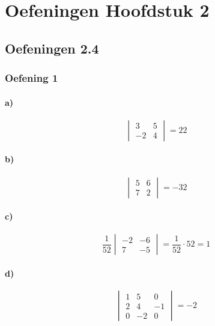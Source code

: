 \documentclass[lineaire_algebra_oplossingen.tex]{subfiles}
\begin{document}
\chapter{Oefeningen Hoofdstuk 2}
\section{Oefeningen 2.4}
\subsection{Oefening 1}
\subsubsection*{a)}
\[
\begin{vmatrix}
3 & 5\\
-2 & 4
\end{vmatrix}
= 22
\]
\subsubsection*{b)}
\[
\begin{vmatrix}
5 & 6\\
7 & 2
\end{vmatrix}
= -32
\]
\subsubsection*{c)}
\[
\frac{1}{52} 
\begin{vmatrix}
-2 & -6\\
7 & -5
\end{vmatrix} 
= \frac{1}{52} \cdot 52 = 1
\]
\subsubsection*{d)}
\[
\begin{vmatrix}
1 & 5 & 0\\
2 & 4 & -1\\
0 & -2 & 0
\end{vmatrix}
= -2
\]
\end{document}
